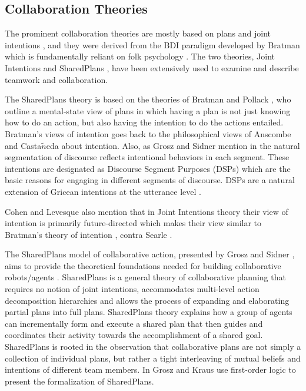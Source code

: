 \subsection{Collaboration Theories}
\label{sec:collaboration-theory}

The prominent collaboration theories are mostly based on plans and joint
intentions
\cite{cohen:teamwork,grosz:plans-discourse,Litman:discourse-commonsense}, and
they were derived from the BDI paradigm developed by Bratman
\cite{bratman:intentions-plans} which is fundamentally reliant on folk
psychology \cite{ravenscroft:folk}. The two theories, Joint Intentions
\cite{cohen:teamwork} and SharedPlans \cite{grosz:plans-discourse}, have been
extensively used to examine and describe teamwork and collaboration.

The SharedPlans theory is based on the theories of Bratman and Pollack
\cite{bratman:plans-reasoning,pollack:plan-inference,pollack:plan-mental-attitudes},
who outline a mental-state view of plans in which having a plan is not just
knowing how to do an action, but also having the intention to do the actions
entailed. Bratman's views of intention goes back to the philosophical views of
Anscombe \cite{anscombe:intention} and Casta$\tilde{n}$eda
\cite{castaneda:thinking} about intention. Also, as Grosz and Sidner mention in
\cite{grosz:plans-discourse} the natural segmentation of discourse reflects
intentional behaviors in each segment. These intentions are designated as
Discourse Segment Purposes (DSPs) which are the basic reasons for engaging in
different segments of discourse. DSPs are a natural extension of Gricean
intentions at the utterance level \cite{neale:grice-language}.

Cohen and Levesque also mention that in Joint Intentions theory their view of
intention is primarily future-directed \cite{cohen:intention-commitment} which
makes their view similar to Bratman's theory of intention
\cite{bratman:intention}, contra Searle \cite{searle:collective}.

The SharedPlans model of collaborative action, presented by Grosz and Sidner
\cite{grosz:planning-acting,grosz:collaboration,grosz:plans-discourse}, aims
to provide the theoretical foundations needed for building collaborative
robots/agents \cite{grosz:collaborative-systems}. SharedPlans is a general
theory of collaborative planning that requires no notion of joint intentions,
accommodates multi-level action decomposition hierarchies and allows the process
of expanding and elaborating partial plans into full plans. SharedPlans theory
explains how a group of agents can incrementally form and execute a shared plan
that then guides and coordinates their activity towards the accomplishment of a
shared goal. SharedPlans is rooted in the observation that collaborative plans
are not simply a collection of individual plans, but rather a tight interleaving
of mutual beliefs and intentions of different team members. In
\cite{grosz:collaboration} Grosz and Kraus use first-order logic to present the
formalization of SharedPlans.

